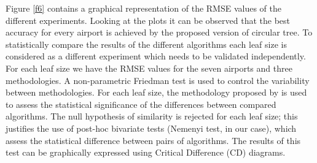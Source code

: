 \documentclass[times,twocolumn,final,authoryear]{elsarticle}
\begin{document}
Figure \ref{f6} contains a graphical representation of the RMSE values of the different experiments. Looking at the plots it can be observed that the best accuracy for every airport is achieved by the proposed version of circular tree. To statistically compare the results of the different algorithms each leaf size is considered as a different experiment which needs to be validated independently. For each leaf size we have the RMSE values for the seven airports and three methodologies. A non-parametric Friedman test is used to control the variability between methodologies. For each leaf size, the methodology proposed by \citep{Demsar2006} is used to assess the statistical significance of the differences between compared algorithms. The null hypothesis of similarity is rejected for each leaf size; this justifies the use of post-hoc bivariate tests (Nemenyi test, in our case), which assess the statistical difference between pairs of algorithms. The results of this test can be graphically expressed using Critical Difference (CD) diagrams.
\end{document}
